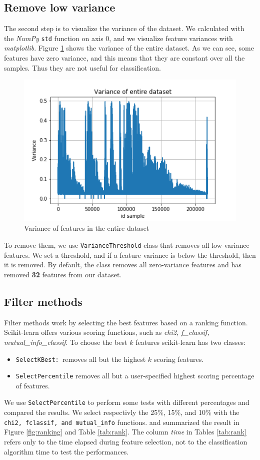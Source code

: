 \subsection{Remove low variance}
The second step is to visualize the variance of the dataset. We calculated with the \textit{NumPy} \texttt{std} function on axis 0, and we visualize feature variances with \textit{matplotlib}. Figure \ref{fig:var_all} shows the variance of the entire dataset. As we can see, some features have zero variance, and this means that they are constant over all the samples. Thus they are not useful for classification.

\begin{figure}[!h]
	\centering
	\includegraphics[width=0.6\columnwidth]{variance-all.png}
	\caption{Variance of features in the entire dataset}
	\label{fig:var_all}
\end{figure}

To remove them, we use \texttt{VarianceThreshold} class that removes all low-variance features. We set a threshold, and if a feature variance is below the threshold, then it is removed. By default, the class removes all zero-variance features and has removed \textbf{32} features from our dataset.

\subsection{Filter methods}

Filter methods work by selecting the best features based on a ranking function. Scikit-learn offers various scoring functions, such as \textit{chi2, f\_classif, mutual\_info\_classif}. To choose the best $k$ features scikit-learn has two classes:
\begin{itemize}
	\item \texttt{SelectKBest: }removes all but the highest $k$ scoring features.
	\item \texttt{SelectPercentile} removes all but a user-specified highest scoring percentage of features.
\end{itemize} 
We use \texttt{SelectPercentile} to perform some tests with different percentages and compared the results. 
We select respectivly the 25\%, 15\%, and 10\% with the \texttt{chi2, fclassif, and mutual\_info} functions. and summarized the result in Figure \ref{fig:ranking} and Table \ref{tab:rank}. The column \textit{time} in Tables \ref{tab:rank} refers only to the time elapsed during feature selection, not to the classification algorithm time to test the performances.

